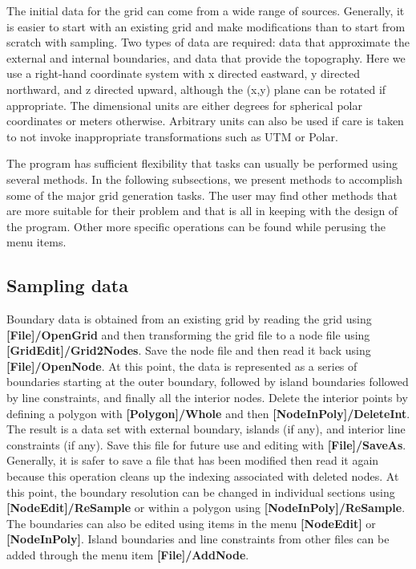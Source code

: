 \documentclass{article}
\begin{document}
The initial data for the grid can come from a wide range of sources. Generally, it is easier to start with an existing grid
and make modifications than to start from scratch with sampling. Two types of data are required: data that approximate 
the external and internal boundaries, and data that provide the topography. Here we use a right-hand coordinate system
with x directed eastward, y directed northward, and z directed upward, although the (x,y) plane can be rotated if
appropriate. The dimensional units are either degrees for spherical polar coordinates or meters otherwise. Arbitrary
units can also be used if care is taken to not invoke inappropriate transformations such as UTM or Polar.

The program has sufficient flexibility that tasks can usually be performed using several methods. In the following 
subsections, we present methods to accomplish some of the major grid generation tasks. The user may find other 
methods that are more suitable for their problem and that is all in keeping with the design of the program. Other
more specific operations can be found while perusing the menu items. 

\subsection{Sampling data}

Boundary data is obtained from an existing grid by reading the grid using \textbf{[File]/OpenGrid} and then
transforming the grid file to a node file using \textbf{[GridEdit]/Grid2Nodes}. Save the node file and then read it back using 
\textbf{[File]/OpenNode}. At this point, the data is represented as a series of boundaries starting at the outer
boundary, followed by island boundaries followed by  line constraints, and finally all the interior nodes. Delete the
 interior points by defining a polygon with \textbf{[Polygon]/Whole} and then \textbf{[NodeInPoly]/DeleteInt}.
The result is a data set with external boundary, islands (if any), and interior line constraints (if any). Save this file
for future use and editing with \textbf{[File]/SaveAs}. Generally, it is safer to save a file that has been modified then
read it again because this operation cleans up the indexing associated with deleted nodes. At this point, the boundary 
resolution can be changed in individual sections using \textbf{[NodeEdit]/ReSample} or within a polygon using 
\textbf{[NodeInPoly]/ReSample}. The boundaries can also be edited using items in the menu \textbf{[NodeEdit]} or
\textbf{[NodeInPoly]}. Island boundaries and line constraints from other files can be added through the menu item
\textbf{[File]/AddNode}.
\end{document}
